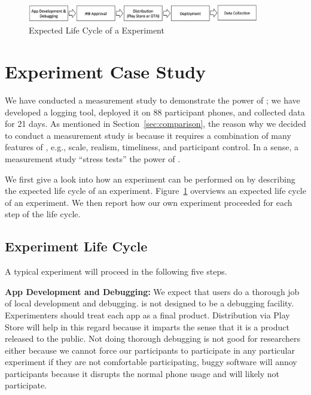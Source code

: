 \begin{figure}[t]
\centering
\includegraphics[width=0.9\textwidth]{experiment-life-cycle.pdf}
\caption{Expected Life Cycle of a \PhoneLab{} Experiment}
\label{fig:experiment-life-cycle}
\end{figure}

\section{Experiment Case Study}
\label{sec-experiment}

We have conducted a measurement study to demonstrate the power of \PhoneLab{};
we have developed a logging tool, deployed it on 88 participant phones, and
collected data for 21 days. As mentioned in Section~\ref{sec:comparison}, the
reason why we decided to conduct a measurement study is because it requires a
combination of many features of \PhoneLab{}, e.g., scale, realism, timeliness,
and participant control. In a sense, a measurement study ``stress tests'' the
power of \PhoneLab{}.

We first give a look into how an experiment can be performed on \PhoneLab{} by
describing the expected life cycle of an experiment.
Figure~\ref{fig:experiment-life-cycle} overviews an expected life cycle of an
experiment. We then report how our own experiment proceeded for each step of the
life cycle.

\subsection{Experiment Life Cycle}

A typical \PhoneLab{} experiment will proceed in the following five steps.

{\bf App Development and Debugging:}
We expect that \PhoneLab{} users do a thorough job of local development and
debugging. \PhoneLab{} is not designed to be a debugging facility. Experimenters
should treat each app as a final product. Distribution via Play Store will help
in this regard because it imparts the sense that it is a product released to the
public. Not doing thorough debugging is not good for researchers either because
we cannot force our participants
to participate in any particular experiment if they are not comfortable 
participating, buggy software will annoy participants because it
disrupts the normal phone usage and will likely not participate.

